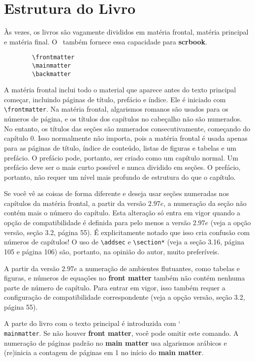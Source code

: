 \chapter{Estrutura do Livro}
Às vezes, os livros são vagamente divididos em matéria frontal, matéria principal e matéria final. O \KOMAScript\ também fornece essa capacidade para \textbf{scrbook}.
\begin{verbatim}
        \frontmatter
        \mainmatter
        \backmatter
\end{verbatim}

A matéria frontal inclui todo o material que aparece antes do texto principal começar, incluindo páginas de título, prefácio e índice. Ele é iniciado com \verb|\frontmatter|. Na matéria frontal, algarismos romanos são usados para os números de página, e os títulos dos capítulos no cabeçalho não são numerados. No entanto, os títulos das seções são numerados consecutivamente, começando do capítulo 0. Isso normalmente não importa, pois a matéria frontal é usada apenas para as páginas de título, índice de conteúdo, listas de figuras e tabelas e um prefácio. O prefácio pode, portanto, ser criado como um capítulo normal. Um prefácio deve ser o mais curto possível e nunca dividido em seções. O prefácio, portanto, não requer um nível mais profundo de estrutura do que o capítulo.

Se você vê as coisas de forma diferente e deseja usar seções numeradas nos capítulos da matéria frontal, a partir da versão $2.97e$, a numeração da seção não contém mais o número do capítulo. Esta alteração só entra em vigor quando a opção de compatibilidade é definida para pelo menos a versão $2.97e$ (veja a opção versão, seção 3.2, página 55). É explicitamente notado que isso cria confusão com números de capítulos! O uso de \verb|\addsec| e \verb|\section*| (veja a seção 3.16, página 105 e página 106) são, portanto, na opinião do autor, muito preferíveis.

A partir da versão $2.97e$ a numeração de ambientes flutuantes, como tabelas e figuras, e números de equações no \textbf{front matter} também não contém nenhuma parte de número de capítulo. Para entrar em vigor, isso também requer a configuração de compatibilidade correspondente (veja a opção versão, seção 3.2, página 55).

A parte do livro com o texto principal é introduzida com \char`\\\texttt{main\-matter}. Se não houver \textbf{front matter}, você pode omitir este comando. A numeração de páginas padrão no \textbf{main matter} usa algarismos arábicos e (re)inicia a contagem de páginas em 1 no início do \textbf{main matter}.

